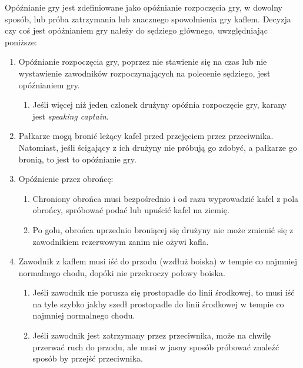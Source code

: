 \documentclass[11pt,a4paper]{article}
\renewcommand{\subsubsection}[1]{
  \oldsubsubsection{#1}%
  \label{\thesubsubsection}
}
\begin{document}
\subsubsection{Opóźnianie gry}

Opóźnianie gry jest zdefiniowane jako opóźnianie rozpoczęcia gry, w
dowolny sposób, lub próba zatrzymania lub znacznego spowolnienia gry
kaflem. Decyzja czy coś jest opóźnianiem gry należy do sędziego
głównego, uwzględniając poniższe:

\begin{enumerate}

\item
  Opóźnianie rozpoczęcia gry, poprzez nie stawienie się na czas lub nie
  wystawienie zawodników rozpoczynających na polecenie sędziego, jest
  opóźnianiem gry.

  \begin{enumerate}
  
  \item
    Jeśli więcej niż jeden członek drużyny opóźnia rozpoczęcie gry,
    karany jest \emph{speaking captain}.
  \end{enumerate}
\item
  Pałkarze mogą bronić leżący kafel przed przejęciem przez przeciwnika.
  Natomiast, jeśli ścigający z ich drużyny nie próbują go zdobyć, a
  pałkarze go bronią, to jest to opóźnianie gry.
\item
  Opóźnienie przez obrońcę:

  \begin{enumerate}
  
  \item
    Chroniony obrońca musi bezpośrednio i od razu wyprowadzić kafel z
    pola obrońcy, spróbować podać lub upuścić kafel na ziemię.
  \item
    Po golu, obrońca uprzednio broniącej się drużyny nie może zmienić
    się z zawodnikiem rezerwowym zanim nie ożywi kafla.
  \end{enumerate}
\item
  Zawodnik z kaflem musi iść do przodu (wzdłuż boiska) w tempie co
  najmniej normalnego chodu, dopóki nie przekroczy połowy boiska.

  \begin{enumerate}
  
  \item
    Jeśli zawodnik nie porusza się prostopadle do linii środkowej, to
    musi iść na tyle szybko jakby szedł prostopadle do linii środkowej w
    tempie co najmniej normalnego chodu.
  \item
    Jeśli zawodnik jest zatrzymany przez przeciwnika, może na chwilę
    przerwać ruch do przodu, ale musi w jasny sposób próbować znaleźć
    sposób by przejść przeciwnika.


\end{enumerate}
\end{enumerate}
\end{document}
